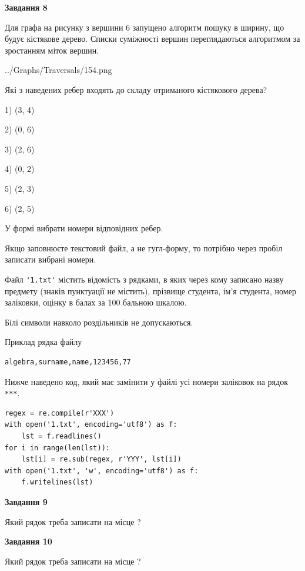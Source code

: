 \documentclass[12pt, ukrainian]{article}
\def\code#1{\Verb!#1!}
\begin{document}
{\begin {large}
{\begin {center}\textbf{Завдання 8}\end {center}}\par
Для графа на рисунку з вершини 6 запущено алгоритм пошуку в ширину, що будує кістякове дерево. Списки суміжності вершин переглядаються алгоритмом за зростанням міток вершин.\par
\begin{center}
	{../Graphs/Traversals/154.png}
\end{center}
\par Які з наведених ребер входять до складу отриманого кістякового дерева?\par
1) (3, 4)\par
2) (0, 6)\par
3) (2, 6)\par
4) (0, 2)\par
5) (2, 3)\par
6) (2, 5)\par
{\vskip 15pt} У формі вибрати номери відповідних ребер.


Якщо заповнюєте текстовий файл, а не гугл-форму, то потрібно через пробіл записа\-ти вибрані номери.\par
\newpage


Файл \code{'1.txt'} містить відомість з рядками, в яких через кому записа\-но назву предмету (знаків пунктуації не містить), прізвище студента, ім'я студента, номер залі\-ков\-ки, оцінку в балах за 100 бальною шкалою.

Білі символи навколо роздільників не допускаються.

Приклад рядка файлу



\begin{verbatim}
algebra,surname,name,123456,77
\end{verbatim}


Нижче наведено код, який має замінити у файлі усі номери заліковок на рядок \code{***}.



\begin{verbatim}
regex = re.compile(r'XXX')
with open('1.txt', encoding='utf8') as f:
    lst = f.readlines()
for i in range(len(lst)):
    lst[i] = re.sub(regex, r'YYY', lst[i])
with open('1.txt', 'w', encoding='utf8') as f:
    f.writelines(lst)
\end{verbatim}




{\begin {center}\textbf{Завдання 9}\end {center}}\par
Який рядок треба записати на місце  ?\par
\vspace{5mm}


{\begin {center}\textbf{Завдання 10}\end {center}}\par
Який рядок треба записати на місце  ?\par


\newpage


\end {large}}
\end{document}

